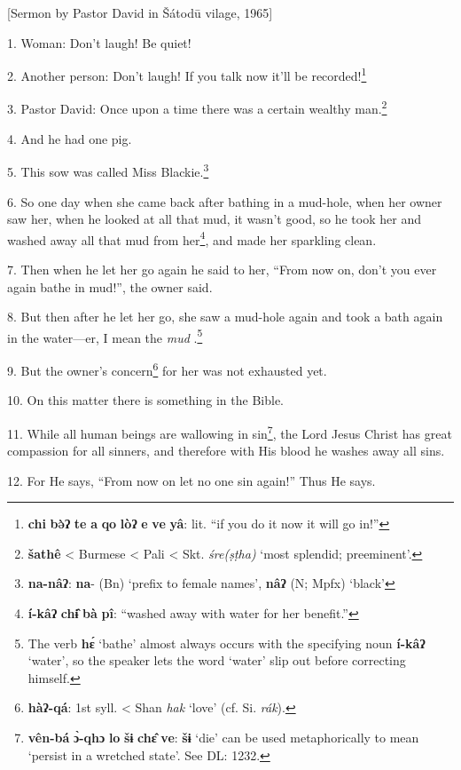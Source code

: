 \setcounter{footnote}{0}

[Sermon by Pastor David in Šátodū vilage, 1965]

1. Woman: Don't laugh! Be quiet!

2. Another person: Don't laugh! If you talk now it'll be recorded!\footnote{\textbf{chi} \textbf{bə̀ʔ} \textbf{te} \textbf{a} \textbf{qo} \textbf{lòʔ} \textbf{e} \textbf{ve} \textbf{yâ}: lit. ``if you do it now it will go in!''}

3. Pastor David: Once upon a time there was a certain wealthy man.\footnote{\textbf{šathê} < Burmese < Pali < Skt. \textit{śre(ṣṭha)} `most splendid; preeminent'.}

4. And he had one pig.

5. This sow was called Miss Blackie.\footnote{\textbf{na-nâʔ}: \textbf{na}- (Bn) `prefix to female names', \textbf{nâʔ} (N; Mpfx) `black'}

6. So one day when she came back after bathing in a mud-hole, when her owner saw
her, when he looked at all that mud, it wasn't good, so he took her and washed
away all that mud from her\footnote{\textbf{í-kâʔ} \textbf{chɨ̂} \textbf{bà} \textbf{pî}: ``washed away with water for her benefit.''}, and made her sparkling clean.

7. Then when he let her go again he said to her, ``From now on, don't you ever
again bathe in mud!'', the owner said.

8. But then after he let her go, she saw a mud-hole again and took a bath again
in the water---er, I mean the \textit{mud }.\footnote{The verb \textbf{hɛ́} `bathe' almost always occurs with the specifying noun \textbf{í-kâʔ} `water', so the speaker lets the word `water' slip out before correcting himself.}

9. But the owner's concern\footnote{\textbf{hàʔ-qá}: 1st syll. < Shan \textit{hak} `love' (cf. Si. \textit{rák}).} for her was not exhausted yet.

10. On this matter there is something in the Bible.

11. While all human beings are wallowing in sin\footnote{\textbf{vên-bá} \textbf{ɔ̀-qhɔ} \textbf{lo} \textbf{šɨ} \textbf{chɛ̂} \textbf{ve}: \textbf{šɨ} `die' can be used metaphorically to mean `persist in a wretched state'. See DL: 1232.}, the Lord Jesus Christ has
great compassion for all sinners, and therefore with His blood he washes away all sins.

12. For He says, ``From now on let no one sin again!'' Thus He says.

